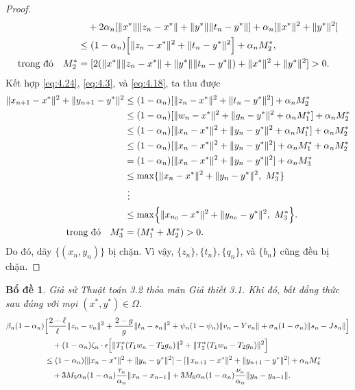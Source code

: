 \documentclass{MyBook}
\theoremstyle{plain}
\newtheorem{lemma}[theorem]{Bổ đề}
\theoremstyle{definition}
\theoremstyle{remark}
\numberwithin{equation}{chapter}
\newcommand{\nm}[1]{\lVert #1\rVert}
\begin{document}
\begin{proof}
\begin{align}
&\quad +2\alpha_n[\nm{x^{*}}\nm{z_n-x^{*}}+\nm{y^{*}}\nm{t_n-y^{*}}]+\alpha_n[\nm{x^{*}}^2+\nm{y^{*}}^2]\notag\\
&\le (1-\alpha_n)\Bigl[\nm{z_n-x^{*}}^2+\nm{t_n-y^{*}}^2\Bigr]+\alpha_n M_2^{*},\notag\\
\text{trong đó}\quad M_2^{*} &= [2(\nm{x^{*}}\nm{z_n-x^{*}}+\nm{y^{*}}\nm{t_n-y^{*}})+\nm{x^{*}}^2+\nm{y^{*}}^2]>0. \label{eq:4.24}
\end{align}
Kết hợp \eqref{eq:4.24}, \eqref{eq:4.3}, và \eqref{eq:4.18}, ta thu được
\begin{align*}
\nm{x_{n+1}-x^{*}}^2+\nm{y_{n+1}-y^{*}}^2 &\le (1-\alpha_n)[\nm{z_n-x^{*}}^2+\nm{t_n-y^{*}}^2]+\alpha_n M_2^{*}\\
&\le (1-\alpha_n)[\nm{w_n-x^{*}}^2+\nm{g_n-y^{*}}^2+\alpha_n M_1^{*}]+\alpha_n M_2^{*}\\
&\le (1-\alpha_n)[\nm{x_n-x^{*}}^2+\nm{y_n-y^{*}}^2+\alpha_n M_1^{*}]+\alpha_n M_2^{*}\\
&\le (1-\alpha_n)[\nm{x_n-x^{*}}^2+\nm{y_n-y^{*}}^2]+\alpha_n M_1^{*}+\alpha_n M_2^{*}\\
&= (1-\alpha_n)[\nm{x_n-x^{*}}^2+\nm{y_n-y^{*}}^2]+\alpha_n M_3^{*}\\
&\le \max\{\nm{x_n-x^{*}}^2+\nm{y_n-y^{*}}^2,\ M_3^{*}\}\\
&\ \vdots\\
&\le \max\Bigl\{\nm{x_{n_0}-x^{*}}^2+\nm{y_{n_0}-y^{*}}^2,\ M_3^{*}\Bigr\}.\\
\text{trong đó}\quad M_3^{*} &= (M_1^{*}+M_2^{*})>0.
\end{align*}
Do đó, dãy $\{(x_n,y_n)\}$ bị chặn. Vì vậy, $\{z_n\},\{t_n\},\{q_n\}$, và $\{b_n\}$ cũng đều bị chặn.
\end{proof}

\begin{lemma}\label{lem:4.5}
Giả sử Thuật toán 3.2 thỏa mãn Giả thiết 3.1. Khi đó, bất đẳng thức sau đúng với mọi $(x^{*},y^{*})\in\Omega$.
\begin{align*}
\beta_n(1-\alpha_n) &\Bigl[\frac{2-\ell}{\ell}\nm{z_n-v_n}^2+\frac{2-g}{g}\nm{t_n-s_n}^2+\psi_n(1-\psi_n)\nm{v_n-Yv_n}+\sigma_n(1-\sigma_n)\nm{s_n-Js_n}\Bigr]\\
&\quad +(1-\alpha_n)\zeta_n\cdot\epsilon\Bigl[\nm{T_1^{*}(T_1w_n-T_2g_n)}^2+\nm{T_2^{*}(T_1w_n-T_2g_n)}^2\Bigr]\\
&\le (1-\alpha_n)[\nm{x_n-x^{*}}^2+\nm{y_n-y^{*}}^2]-[\nm{x_{n+1}-x^{*}}^2+\nm{y_{n+1}-y^{*}}^2]+\alpha_n M_4^{*}\\
&\quad +3M_5\alpha_n(1-\alpha_n)\frac{\tau_n}{\alpha_n}\nm{x_n-x_{n-1}}+3M_6\alpha_n(1-\alpha_n)\frac{\nu_n}{\alpha_n}\nm{y_n-y_{n-1}}.
\end{align*}
\end{lemma}
\end{document}
